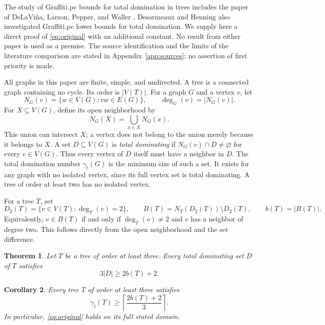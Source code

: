 \documentclass[11pt,a4paper]{article}
\newtheorem{theorem}{Theorem}[section]
\newtheorem{corollary}[theorem]{Corollary}
\theoremstyle{remark}
\newcommand{\td}{\gamma_t}
\newcommand{\BB}{B}
\begin{document}
The study of Graffiti.pc bounds for total domination in trees includes
the paper of DeLaVi\~na, Larson, Pepper, and Waller \cite{dlpw}.
Desormeaux and Henning \cite{dh} also investigated Graffiti.pc lower
bounds for total domination. We supply here a direct proof of
\eqref{eq:original} with an additional constant. No result from either
paper is used as a premise. The source identification and the limits of
the literature comparison are stated in Appendix~\ref{app:sources};
no assertion of first priority is made.

All graphs in this paper are finite, simple, and undirected. A tree is
a connected graph containing no cycle. Its order is $|V(T)|$.
For a graph $G$ and a vertex $v$, let
\[
 N_G(v)=\{w\in V(G):vw\in E(G)\},\qquad \deg_G(v)=|N_G(v)|.
\]
For $X\subseteq V(G)$, define its open neighborhood by
\[
 N_G(X)=\bigcup_{x\in X}N_G(x).
\]
This union can intersect $X$; a vertex does not belong to the union
merely because it belongs to $X$. A set $D\subseteq V(G)$ is
\emph{total dominating} if $N_G(v)\cap D\ne\varnothing$ for every
$v\in V(G)$. Thus every vertex of $D$ itself must have a neighbor in
$D$. The total domination number $\td(G)$ is the minimum size of such
a set. It exists for any graph with no isolated vertex, since its full
vertex set is total dominating. A tree of order at least two has no
isolated vertex.

For a tree $T$, set
\begin{equation}\label{eq:boundary}
 D_2(T)=\{v\in V(T):\deg_T(v)=2\},\qquad
 \BB(T)=N_T(D_2(T))\setminus D_2(T),\qquad b(T)=|\BB(T)|.
\end{equation}
Equivalently, $v\in\BB(T)$ if and only if $\deg_T(v)\ne 2$ and
$v$ has a neighbor of degree two. This follows directly
from the open neighborhood and the set difference.

\begin{theorem}\label{thm:main}
Let $T$ be a tree of order at least three. Every total dominating set
$D$ of $T$ satisfies
\begin{equation}\label{eq:main}
 3|D|\ge 2b(T)+2.
\end{equation}
\end{theorem}

\begin{corollary}\label{cor:348}
Every tree $T$ of order at least three satisfies
\begin{equation}\label{eq:ceiling}
 \td(T)\ge\left\lceil\frac{2b(T)+2}{3}\right\rceil.
\end{equation}
In particular, \eqref{eq:original} holds on its full stated domain.
\end{corollary}
\end{document}
